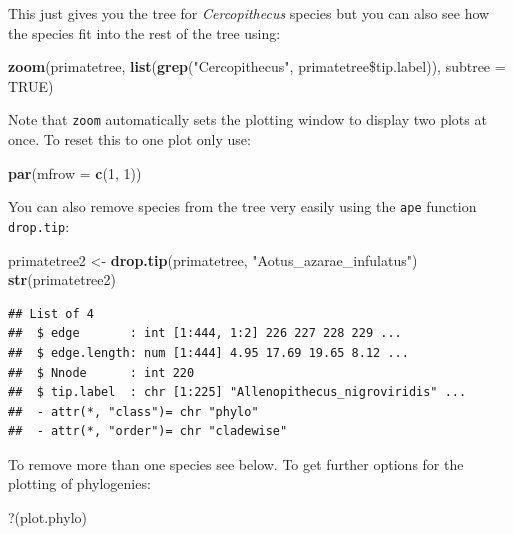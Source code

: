 \documentclass[12pt]{article}
\newcommand{\KeywordTok}[1]{\textcolor[rgb]{0.13,0.29,0.53}{\textbf{{#1}}}}
\newcommand{\DataTypeTok}[1]{\textcolor[rgb]{0.13,0.29,0.53}{{#1}}}
\newcommand{\DecValTok}[1]{\textcolor[rgb]{0.00,0.00,0.81}{{#1}}}
\newcommand{\StringTok}[1]{\textcolor[rgb]{0.31,0.60,0.02}{{#1}}}
\newcommand{\OtherTok}[1]{\textcolor[rgb]{0.56,0.35,0.01}{{#1}}}
\newcommand{\NormalTok}[1]{{#1}}
\begin{document}
This just gives you the tree for \textit{Cercopithecus} species but you can also see how the species fit into the rest of the tree using:

\begin{snugshade}
\begin{Highlighting}[]
\KeywordTok{zoom}\NormalTok{(primatetree, }\KeywordTok{list}\NormalTok{(}\KeywordTok{grep}\NormalTok{(}\StringTok{"Cercopithecus"}\NormalTok{, primatetree\$tip.label)), }
      \DataTypeTok{subtree =} \OtherTok{TRUE}\NormalTok{)}
\end{Highlighting}
\end{snugshade}

Note that \texttt{zoom} automatically sets the plotting window to display two plots at once. To reset this to one plot only use:

\begin{snugshade}
\begin{Highlighting}[]
\KeywordTok{par}\NormalTok{(}\DataTypeTok{mfrow =} \KeywordTok{c}\NormalTok{(}\DecValTok{1}\NormalTok{, }\DecValTok{1}\NormalTok{))}
\end{Highlighting}
\end{snugshade}

You can also remove species from the tree very easily using the \texttt{ape} function \texttt{drop.tip}:

\begin{snugshade}
\begin{Highlighting}[]
\NormalTok{primatetree2 <-}\StringTok{ }\KeywordTok{drop.tip}\NormalTok{(primatetree, } \StringTok{"Aotus_azarae_infulatus"}\NormalTok{)}\\

\KeywordTok{str}\NormalTok{(primatetree2)}
\end{Highlighting}
\end{snugshade}

\begin{verbatim}
## List of 4
##  $ edge       : int [1:444, 1:2] 226 227 228 229 ...
##  $ edge.length: num [1:444] 4.95 17.69 19.65 8.12 ...
##  $ Nnode      : int 220
##  $ tip.label  : chr [1:225] "Allenopithecus_nigroviridis" ...
##  - attr(*, "class")= chr "phylo"
##  - attr(*, "order")= chr "cladewise"
\end{verbatim}

To remove more than one species see below. To get further options for the plotting of phylogenies:

\begin{snugshade}
\begin{Highlighting}[]
\DataTypeTok{?}\NormalTok{(plot.phylo)}
\end{Highlighting}
\end{snugshade}
\end{document}
